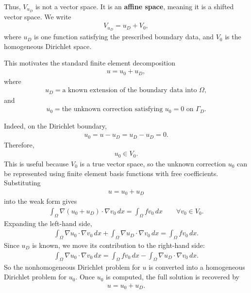 \documentclass[../main.tex]{subfiles}
\begin{document}
Thus, $V_{u_D}$ is not a vector space. It is an \textbf{affine space}, meaning it is a shifted vector space. We write
\begin{align*}
    V_{u_D} = u_D + V_0,
\end{align*}
where $u_D$ is one function satisfying the prescribed boundary data, and $V_0$ is the homogeneous Dirichlet space.

This motivates the standard finite element decomposition
\begin{align*}
    u = u_0 + u_D,
\end{align*}
where
\begin{align*}
    u_D = \text{a known extension of the boundary data into } \Omega,
\end{align*}
and
\begin{align*}
    u_0 = \text{the unknown correction satisfying } u_0=0 \text{ on } \Gamma_D.
\end{align*}

Indeed, on the Dirichlet boundary,
\begin{align*}
    u_0 = u-u_D = u_D-u_D = 0.
\end{align*}
Therefore,
\begin{align*}
    u_0 \in V_0.
\end{align*}
This is useful because $V_0$ is a true vector space, so the unknown correction $u_0$ can be represented using finite element basis functions with free coefficients. Substituting
\begin{align*}
    u = u_0 + u_D
\end{align*}
into the weak form gives
\begin{align*}
    \int_\Omega \nabla (u_0+u_D) \cdot \nabla v_0 \, dx
    =
    \int_\Omega f v_0 \, dx
    \qquad \forall v_0 \in V_0.
\end{align*}
Expanding the left-hand side,
\begin{align*}
    \int_\Omega \nabla u_0 \cdot \nabla v_0 \, dx
    +
    \int_\Omega \nabla u_D \cdot \nabla v_0 \, dx
    =
    \int_\Omega f v_0 \, dx.
\end{align*}
Since $u_D$ is known, we move its contribution to the right-hand side:
\begin{align*}
    \int_\Omega \nabla u_0 \cdot \nabla v_0 \, dx
    =
    \int_\Omega f v_0 \, dx
    -
    \int_\Omega \nabla u_D \cdot \nabla v_0 \, dx.
\end{align*}
So the nonhomogeneous Dirichlet problem for $u$ is converted into a homogeneous Dirichlet problem for $u_0$. Once $u_0$ is computed, the full solution is recovered by
\begin{align*}
    u = u_0 + u_D.
\end{align*}
\end{document}
